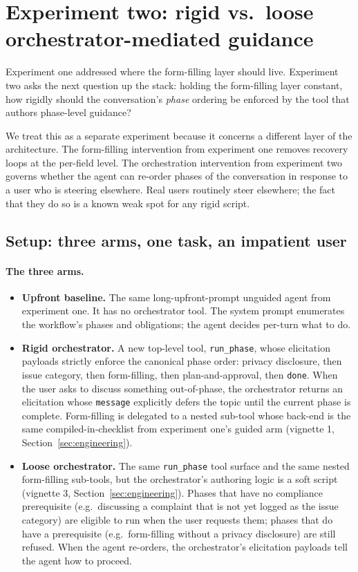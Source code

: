 \documentclass[11pt,a4paper]{article}
\begin{document}
\section{Experiment two: rigid vs.\ loose orchestrator-mediated guidance}
\label{sec:exp2}

Experiment one addressed where the form-filling layer should live. Experiment two asks the next question up the stack: holding the form-filling layer constant, how rigidly should the conversation's \emph{phase} ordering be enforced by the tool that authors phase-level guidance?

We treat this as a separate experiment because it concerns a different layer of the architecture. The form-filling intervention from experiment one removes recovery loops at the per-field level. The orchestration intervention from experiment two governs whether the agent can re-order phases of the conversation in response to a user who is steering elsewhere. Real users routinely steer elsewhere; the fact that they do so is a known weak spot for any rigid script.

\subsection{Setup: three arms, one task, an impatient user}

\paragraph{The three arms.}
\begin{itemize}[noitemsep]
    \item \textbf{Upfront baseline.} The same long-upfront-prompt unguided agent from experiment one. It has no orchestrator tool. The system prompt enumerates the workflow's phases and obligations; the agent decides per-turn what to do.
    \item \textbf{Rigid orchestrator.} A new top-level tool, \texttt{run\_phase}, whose elicitation payloads strictly enforce the canonical phase order: privacy disclosure, then issue category, then form-filling, then plan-and-approval, then \texttt{done}. When the user asks to discuss something out-of-phase, the orchestrator returns an elicitation whose \texttt{message} explicitly defers the topic until the current phase is complete. Form-filling is delegated to a nested sub-tool whose back-end is the same compiled-in-checklist from experiment one's guided arm (vignette 1, Section~\ref{sec:engineering}).
    \item \textbf{Loose orchestrator.} The same \texttt{run\_phase} tool surface and the same nested form-filling sub-tools, but the orchestrator's authoring logic is a soft script (vignette 3, Section~\ref{sec:engineering}). Phases that have no compliance prerequisite (e.g.\ discussing a complaint that is not yet logged as the issue category) are eligible to run when the user requests them; phases that do have a prerequisite (e.g.\ form-filling without a privacy disclosure) are still refused. When the agent re-orders, the orchestrator's elicitation payloads tell the agent how to proceed.
\end{itemize}
\end{document}
